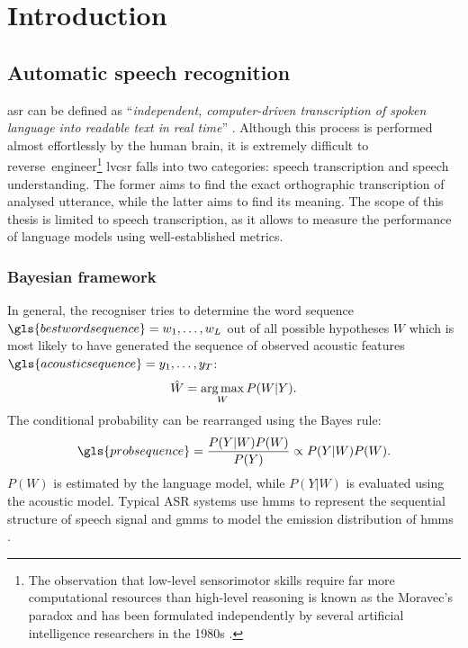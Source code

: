 \chapter{Introduction}
\label{chapter:intro}

\section{Automatic speech recognition}
\label{section:asr}
\Gls{asr} can be defined as \enquote{\textit{independent, computer-driven transcription of spoken language into readable text in real time}} \cite{stuckless1994developments, jelinek1997statistical}. Although this process is performed almost effortlessly by the human brain, it is extremely difficult to reverse~engineer\footnote{The observation that low-level sensorimotor skills require far more computational resources than high-level reasoning is known as the Moravec's paradox and has been formulated independently by several artificial intelligence researchers in the 1980s \cite{moravec1988mind}.} \Gls{lvcsr} falls into two categories: speech transcription and speech understanding. The former aims to find the exact orthographic transcription of analysed utterance, while the latter aims to find its meaning. The scope of this thesis is limited to speech transcription, as it allows to measure the performance of language models using well-established metrics.

\subsection{Bayesian framework}
\label{subsection:bayesian}
In general, the recogniser tries to determine the word sequence $\gls{bestwordsequence}=w_{1}, \ldots, w_{L}$ out of all possible hypotheses $W$ which is most likely to have generated the sequence of observed acoustic features $\gls{acousticsequence}=y_{1}, \ldots, y_{T}$:
\begin{equation}
\label{equation:recogniser}
  \hat{W}=\operatorname*{arg\, max}_{W}P(W|Y).
\end{equation}
The conditional probability can be rearranged using the Bayes rule:
\begin{equation}
  \label{equation:bayesian}
  \gls{probsequence}=\frac{P(Y|W)P(W)}{P(Y)}\propto{P(Y|W)P(W)}.
\end{equation}
$P(W)$ is estimated by the language model, while $P(Y|W)$ is evaluated using the acoustic model. Typical ASR systems use \glspl{hmm} to represent the sequential structure of speech signal and \glspl{gmm} to model the emission distribution of \glspl{hmm} \cite{baker1975dragon, bourlard1994connectionist}.

